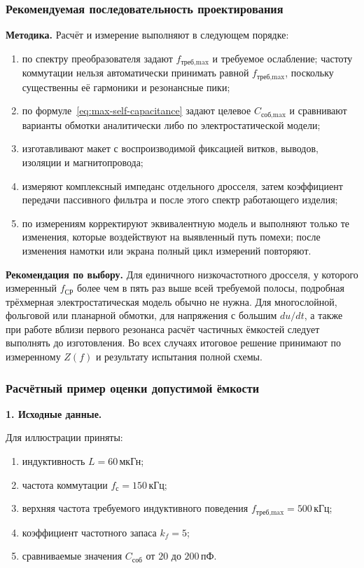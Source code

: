 \documentclass[14pt,a4paper]{extarticle}
\newcommand{\method}{\par\noindent\textbf{Методика.} }
\newcommand{\recommend}{\par\noindent\textbf{Рекомендация по выбору.} }
\begin{document}
\subsubsection{Рекомендуемая последовательность проектирования}

\method Расчёт и измерение выполняют в следующем порядке:
\begin{enumerate}
\item по спектру преобразователя задают $f_{\text{треб,max}}$ и требуемое
ослабление; частоту коммутации нельзя автоматически принимать равной
$f_{\text{треб,max}}$, поскольку существенны её гармоники и резонансные пики;
\item по формуле~\eqref{eq:max-self-capacitance} задают целевое
$C_{\text{соб,max}}$ и сравнивают варианты обмотки аналитически либо по
электростатической модели;
\item изготавливают макет с воспроизводимой фиксацией витков, выводов,
изоляции и магнитопровода;
\item измеряют комплексный импеданс отдельного дросселя, затем коэффициент
передачи пассивного фильтра и после этого спектр работающего изделия;
\item по измерениям корректируют эквивалентную модель и выполняют только те
изменения, которые воздействуют на выявленный путь помехи; после изменения
намотки или экрана полный цикл измерений повторяют.
\end{enumerate}

\recommend Для единичного низкочастотного дросселя, у которого измеренный
$f_{\text{СР}}$ более чем в пять раз выше всей требуемой полосы, подробная
трёхмерная электростатическая модель обычно не нужна. Для многослойной,
фольговой или планарной обмотки, для напряжения с большим $du/dt$, а также при
работе вблизи первого резонанса расчёт частичных ёмкостей следует выполнять
до изготовления. Во всех случаях итоговое решение принимают по измеренному
$Z(f)$ и результату испытания полной схемы.

\subsubsection{Расчётный пример оценки допустимой ёмкости}

\textbf{1. Исходные данные.}

Для иллюстрации приняты:
\begin{enumerate}
\item индуктивность $L=60\,\text{мкГн}$;
\item частота коммутации $f_{\text{с}}=150\,\text{кГц}$;
\item верхняя частота требуемого индуктивного поведения
$f_{\text{треб,max}}=500\,\text{кГц}$;
\item коэффициент частотного запаса $k_f=5$;
\item сравниваемые значения $C_{\text{соб}}$ от $20$ до
$200\,\text{пФ}$.
\end{enumerate}
\end{document}

